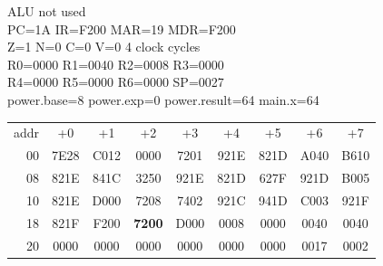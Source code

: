\begin{tcolorbox}[stepbox, title={Step 39 \hfill PC 19 \quad OUT R1}]
\textcolor{dim}{ALU} \textcolor{dim}{not used}\\
PC=1A IR=F200 MAR=19 MDR=F200\\
Z=1 N=0 C=0 V=0 \hfill \textcolor{dim}{4 clock cycles}\\
R0=0000 R1=0040 R2=0008 R3=0000\\
R4=0000 R5=0000 R6=0000 SP=0027\\
\textcolor{dim}{power.base=8  power.exp=0  power.result=64  main.x=64}\\[1pt]
{\setlength{\tabcolsep}{1.6pt}\begin{tabular}{@{}r*{8}{c}@{}}
\textcolor{dim}{addr} & \textcolor{dim}{+0} & \textcolor{dim}{+1} & \textcolor{dim}{+2} & \textcolor{dim}{+3} & \textcolor{dim}{+4} & \textcolor{dim}{+5} & \textcolor{dim}{+6} & \textcolor{dim}{+7}\\
\textcolor{dim}{00} & 7E28 & C012 & 0000 & 7201 & 921E & 821D & A040 & B610\\
\textcolor{dim}{08} & 821E & 841C & 3250 & 921E & 821D & 627F & 921D & B005\\
\textcolor{dim}{10} & 821E & D000 & 7208 & 7402 & 921C & 941D & C003 & 921F\\
\textcolor{dim}{18} & 821F & F200 & \cellcolor{pcc}\textbf{7200} & D000 & \cellcolor{datac}0008 & \cellcolor{datac}0000 & \cellcolor{datac}0040 & \cellcolor{datac}0040\\
\textcolor{dim}{20} & \cellcolor{stackc}0000 & \cellcolor{stackc}0000 & \cellcolor{stackc}0000 & \cellcolor{stackc}0000 & \cellcolor{stackc}0000 & \cellcolor{stackc}0000 & \cellcolor{stackc}0017 & \cellcolor{stackc}0002\\
\end{tabular}}
\end{tcolorbox}\par\vspace{3pt}
